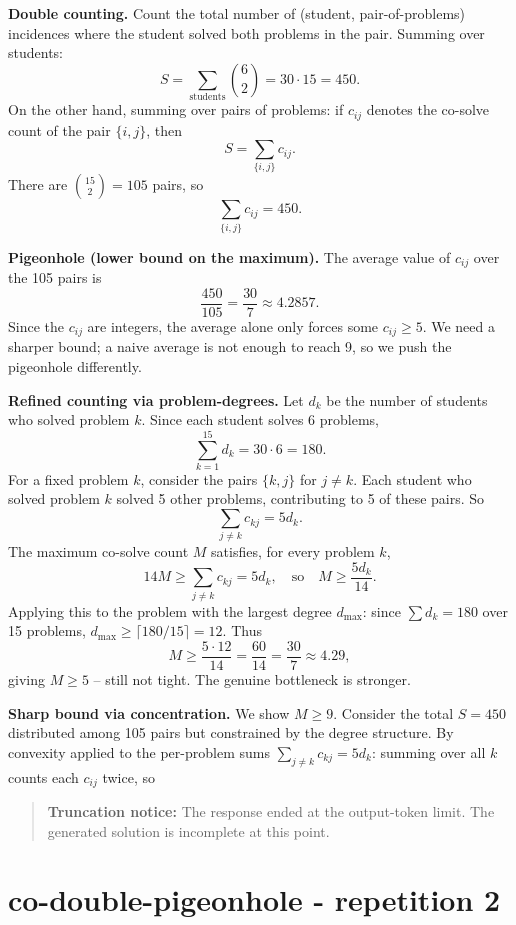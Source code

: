 \documentclass[
  11pt,
  letterpaper,
]{article}
\begin{document}
\textbf{Double counting.} Count the total number of (student,
pair-of-problems) incidences where the student solved both problems in
the pair. Summing over students: \[
S = \sum_{\text{students}} \binom{6}{2} = 30 \cdot 15 = 450.
\] On the other hand, summing over pairs of problems: if \(c_{ij}\)
denotes the co-solve count of the pair \(\{i,j\}\), then \[
S = \sum_{\{i,j\}} c_{ij}.
\] There are \(\binom{15}{2} = 105\) pairs, so \[
\sum_{\{i,j\}} c_{ij} = 450.
\]

\textbf{Pigeonhole (lower bound on the maximum).} The average value of
\(c_{ij}\) over the 105 pairs is \[
\frac{450}{105} = \frac{30}{7} \approx 4.2857.
\] Since the \(c_{ij}\) are integers, the average alone only forces some
\(c_{ij} \ge 5\). We need a sharper bound; a naive average is not enough
to reach 9, so we push the pigeonhole differently.

\textbf{Refined counting via problem-degrees.} Let \(d_k\) be the number
of students who solved problem \(k\). Since each student solves 6
problems, \[
\sum_{k=1}^{15} d_k = 30 \cdot 6 = 180.
\] For a fixed problem \(k\), consider the pairs \(\{k, j\}\) for
\(j \ne k\). Each student who solved problem \(k\) solved 5 other
problems, contributing to 5 of these pairs. So \[
\sum_{j \ne k} c_{kj} = 5 d_k.
\] The maximum co-solve count \(M\) satisfies, for every problem \(k\),
\[
14 M \ge \sum_{j \ne k} c_{kj} = 5 d_k, \quad\text{so}\quad M \ge \frac{5 d_k}{14}.
\] Applying this to the problem with the largest degree \(d_{\max}\):
since \(\sum d_k = 180\) over 15 problems,
\(d_{\max} \ge \lceil 180/15 \rceil = 12\). Thus \[
M \ge \frac{5 \cdot 12}{14} = \frac{60}{14} = \frac{30}{7} \approx 4.29,
\] giving \(M \ge 5\) -- still not tight. The genuine bottleneck is
stronger.

\textbf{Sharp bound via concentration.} We show \(M \ge 9\). Consider
the total \(S=450\) distributed among 105 pairs but constrained by the
degree structure. By convexity applied to the per-problem sums
\(\sum_{j\ne k} c_{kj} = 5 d_k\): summing over all \(k\) counts each
\(c_{ij}\) twice, so

\begin{quote}
\textbf{Truncation notice:} The response ended at the output-token
limit. The generated solution is incomplete at this point.
\end{quote}

\clearpage

\section{co-double-pigeonhole - repetition
2}\label{co-double-pigeonhole---repetition-2}
\end{document}
